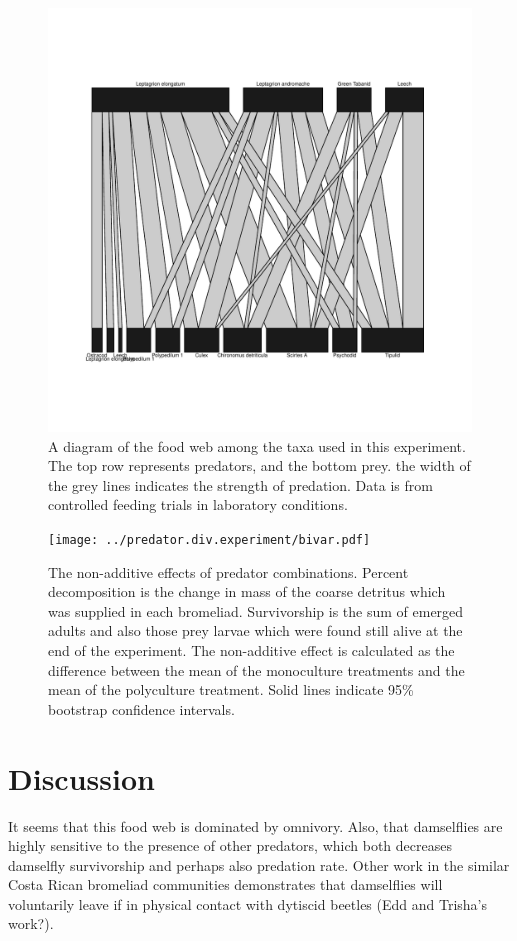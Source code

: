 \documentclass[10pt]{article}
\begin{document}
\begin{spacing}{2}
\begin{figure}
  \centering
  \includegraphics{../figures/FoodwebExperimentSpecies.pdf}
  \caption{A diagram of the food web among the taxa used in this
experiment. The top row represents predators, and the bottom prey.
the width of the grey lines indicates the strength of predation. Data
is from controlled feeding trials in laboratory conditions.}
\label{fig:foodweb}
\end{figure}


\begin{figure}
  \centering
  \texttt{[image: ../predator.div.experiment/bivar.pdf]}
  \caption{The non-additive effects of predator combinations. Percent
    decomposition is the change in mass of the coarse detritus which
    was supplied in each bromeliad.  Survivorship is the sum of
    emerged adults and also those prey larvae which were found still
    alive at the end of the experiment.  The non-additive effect is
    calculated as the difference between the mean of the monoculture
    treatments and the mean of the polyculture treatment. Solid lines
    indicate 95\% bootstrap confidence intervals.}
\label{fig:prednonadd}
\end{figure}


\section{Discussion}

It seems that this food web is dominated by omnivory.  Also, that
damselflies are highly sensitive to the presence of other predators,
which both decreases damselfly survivorship and perhaps also predation
rate.  Other work in the similar Costa Rican bromeliad communities
demonstrates that damselflies will voluntarily leave if in physical
contact with dytiscid beetles (Edd and Trisha's work?).

\end{spacing}

 
\end{document}
